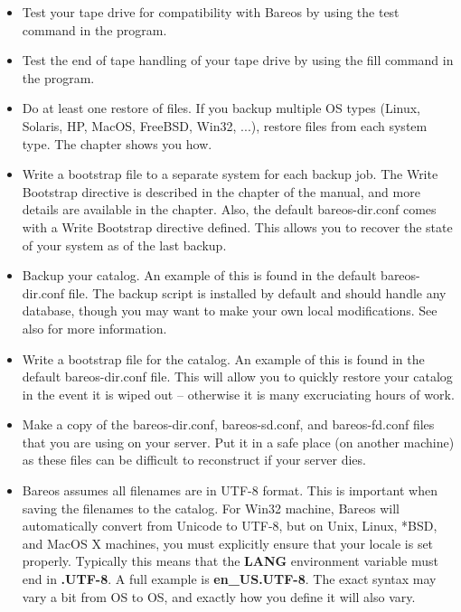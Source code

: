 \begin{itemize}
\item Test your tape drive for compatibility with Bareos by using the  test
   command in the  program.
\item Test the end of tape handling of your tape drive by using the
   fill command in the  program.
\item Do at least one restore of files. If you backup multiple OS types
   (Linux, Solaris, HP, MacOS, FreeBSD, Win32, ...),
   restore files from each system type. The
    chapter shows you how.
\item Write a bootstrap file to a separate system for each backup job.  The
   Write Bootstrap directive is described in the
     chapter of the
   manual, and more details are available in the
    chapter. Also, the default
   bareos-dir.conf comes with a Write Bootstrap directive defined. This  allows
   you to recover the state of your system as of the last backup.
\item Backup your catalog. An example of this is found in the default
   bareos-dir.conf file. The backup script is installed by default and
   should handle any database, though you may want to make your own local
   modifications.  See also  for more
   information.
\item Write a bootstrap file for the catalog. An example of this is found in
   the default bareos-dir.conf file. This will allow you to quickly restore your
   catalog in the event it is wiped out -- otherwise it  is many excruciating
   hours of work.
\item Make a copy of the bareos-dir.conf, bareos-sd.conf, and
   bareos-fd.conf files that you are using on your server. Put it in a safe
   place (on another machine) as these files can be difficult to
   reconstruct if your server dies.
\item Bareos assumes all filenames are in UTF-8 format. This is important
   when saving the filenames to the catalog. For Win32 machine, Bareos will
   automatically convert from Unicode to UTF-8, but on Unix, Linux, *BSD,
   and MacOS X machines, you must explicitly ensure that your locale is set
   properly. Typically this means that the {\bf LANG} environment variable
   must end in {\bf .UTF-8}. A full example is {\bf en\_US.UTF-8}. The
   exact syntax may vary a bit from OS to OS, and exactly how you define it
   will also vary.


\end{itemize}
